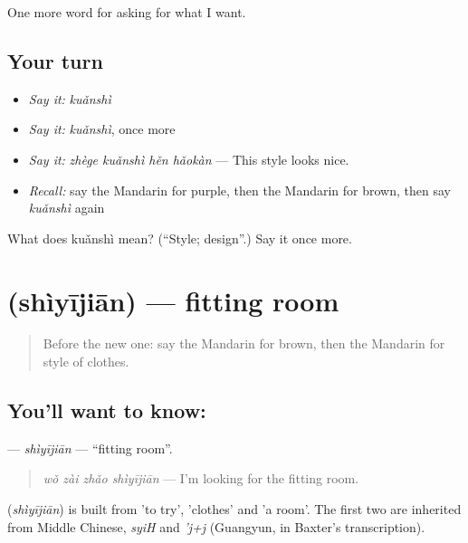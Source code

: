 \begin{grammarlens}[title={What you've built}]
One more word for asking for what I want.
\end{grammarlens}

\subsection*{Your turn}
\begin{itemize}
\raggedright
  \item \emph{Say it:} \emph{kuǎnshì}
  \item \emph{Say it:} \emph{kuǎnshì}, once more
  \item \emph{Say it:} \emph{zhège kuǎnshì hěn hǎokàn} — This style looks nice.
  \item \emph{Recall:} say the Mandarin for purple, then the Mandarin for brown, then say \emph{kuǎnshì} again
\end{itemize}

\begin{tcolorbox}[breakable,colback=teal!4,colframe=teal!35!black,title={Before you move on}]
What does kuǎnshì mean? (\textquotedblleft{}Style; design\textquotedblright{}.) Say it once more.
\end{tcolorbox}
\section[\texorpdfstring{\zh{试衣间} (shìyījiān)}{试衣间 (shìyījiān)}]{ (shìyījiān) — fitting room}

\label{lesson:ZH-C210-shiyijian}



\begin{quote}
Before the new one: say the Mandarin for brown, then the Mandarin for style of clothes.
\end{quote}

\subsection*{You'll want to know: }
\textbf{} — \emph{shìyījiān} — \textquotedblleft{}fitting room\textquotedblright{}.

\begin{quote}
\textbf{} \emph{wǒ zài zhǎo shìyījiān} — I'm looking for the fitting room.
\end{quote}

\begin{cousinweb}
\textbf{} (\emph{shìyījiān}) is built from  'to try',  'clothes' and  'a room'. The first two are inherited from Middle Chinese, \emph{syiH} and \emph{'j+j} (Guangyun, in Baxter's transcription).
\end{cousinweb}

